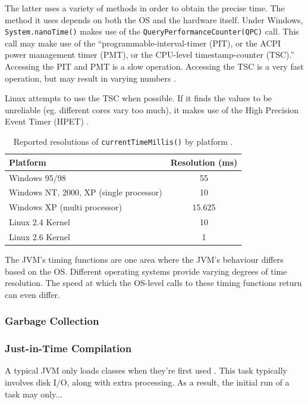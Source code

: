 \documentclass[12pt,letterpaper,oneside,notitlepage]{report}
\theoremstyle{definition}
\begin{document}
					The latter uses a variety of methods in order to obtain the precise time.  The method it uses depends on both the OS and the hardware itself.  Under Windows, \texttt{System.nanoTime()} makes use of the \texttt{QueryPerformanceCounter(QPC)} call.  This call may make use of the ``programmable-interval-timer (PIT), or the ACPI power management timer (PMT), or the CPU-level timestamp-counter (TSC).'' \cite{hotspot-timer-06}  Accessing the PIT and PMT is a slow operation.  Accessing the TSC is a very fast operation, but may result in varying numbers \cite{linux-tsc-06}.
					
					Linux attempts to use the TSC when possible.  If it finds the values to be unreliable (eg. different cores vary too much), it makes use of the High Precision Event Timer (HPET) \cite{linux-tsc-06}.
					
					\begin{table}[!ht]
						\centering
						\begin{tabular}{lc}
							\toprule
							Platform & Resolution (ms) \\
							\midrule
							Windows 95/98 & 55 \\
							Windows NT, 2000, XP (single processor) & 10 \\
							Windows XP (multi processor) & 15.625 \\
							Linux 2.4 Kernel & 10 \\
							Linux 2.6 Kernel & 1 \\
							\bottomrule
						\end{tabular}
						\caption{Reported resolutions of \texttt{currentTimeMillis()} by platform \cite{rob-java-bench-08}.}
					\end{table}
					
					The JVM's timing functions are one area where the JVM's behaviour differs based on the OS.  Different operating systems provide varying degrees of time resolution.  The speed at which the OS-level calls to these timing functions return can even differ.
				
				\subsubsection{Garbage Collection}
			
				\subsubsection{Just-in-Time Compilation}
					A typical JVM only loads classes when they're first used \cite{rob-java-bench-08}.  This task typically involves disk I/O, along with extra processing.  As a result, the initial run of a task may only...
			
\end{document}
